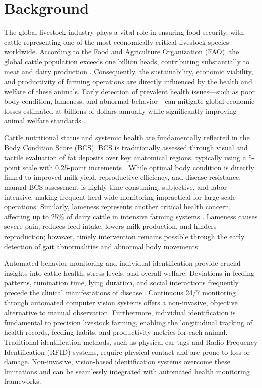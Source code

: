 \section{Background}

The global livestock industry plays a vital role in ensuring food security, with cattle representing one of the most economically critical livestock species worldwide. According to the Food and Agriculture Organization (FAO), the global cattle population exceeds one billion heads, contributing substantially to meat and dairy production \cite{fao2023livestock}. Consequently, the sustainability, economic viability, and productivity of farming operations are directly influenced by the health and welfare of these animals. Early detection of prevalent health issues---such as poor body condition, lameness, and abnormal behavior---can mitigate global economic losses estimated at billions of dollars annually while significantly improving animal welfare standards \cite{weary2009understanding}.

Cattle nutritional status and systemic health are fundamentally reflected in the Body Condition Score (BCS). BCS is traditionally assessed through visual and tactile evaluation of fat deposits over key anatomical regions, typically using a 5-point scale with 0.25-point increments \cite{edmonson1989bcs}. While optimal body condition is directly linked to improved milk yield, reproductive efficiency, and disease resistance, manual BCS assessment is highly time-consuming, subjective, and labor-intensive, making frequent herd-wide monitoring impractical for large-scale operations. Similarly, lameness represents another critical health concern, affecting up to 25\% of dairy cattle in intensive farming systems \cite{whay2003lameness}. Lameness causes severe pain, reduces feed intake, lowers milk production, and hinders reproduction; however, timely intervention remains possible through the early detection of gait abnormalities and abnormal body movements.

Automated behavior monitoring and individual identification provide crucial insights into cattle health, stress levels, and overall welfare. Deviations in feeding patterns, rumination time, lying duration, and social interactions frequently precede the clinical manifestations of disease \cite{weary2009understanding}. Continuous 24/7 monitoring through automated computer vision systems offers a non-invasive, objective alternative to manual observation. Furthermore, individual identification is fundamental to precision livestock farming, enabling the longitudinal tracking of health records, feeding habits, and productivity metrics for each animal. Traditional identification methods, such as physical ear tags and Radio Frequency Identification (RFID) systems, require physical contact and are prone to loss or damage. Non-invasive, vision-based identification systems overcome these limitations and can be seamlessly integrated with automated health monitoring frameworks.

